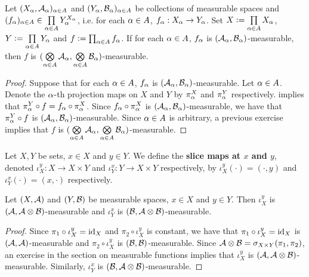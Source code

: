 \documentclass{book}
\begin{document}
	\begin{ex} 
		Let $(X_{\alpha}, \mathcal{A}_{\alpha})_{\alpha \in A}$ and $(Y_{\alpha}, \mathcal{B}_{\alpha})_{\alpha \in A}$ be collections of measurable spaces and $(f_{\alpha})_{\alpha \in A} \in \prod\limits_{\alpha \in A} Y_{\alpha}^{X_{\alpha}}$, i.e. for each $\alpha \in A$, $f_{\alpha}:X_{\alpha} \rightarrow Y_{\alpha}$. Set $X \vcentcolon= \prod\limits_{\alpha \in A} X_{\alpha}$, $Y \vcentcolon= \prod\limits_{\alpha \in A}Y_{\alpha}$ and $f \vcentcolon= \prod_{\alpha \in A} f_{\alpha}$. If for each $\alpha \in A$, $f_{\alpha}$ is $(\mathcal{A}_{\alpha}, \mathcal{B}_{\alpha})$-measurable, then $f$ is $(\bigotimes\limits_{\alpha \in A} \mathcal{A}_{\alpha}, \bigotimes\limits_{\alpha \in A} \mathcal{B}_{\alpha})$-measurable.
	\end{ex}
	
	\begin{proof} 
		Suppose that for each $\alpha \in A$, $f_{\alpha}$ is $(\mathcal{A}_{\alpha}, \mathcal{B}_{\alpha})$-measurable. Let $\alpha \in A$. Denote the $\alpha$-th projection maps on $X$ and $Y$ by $\pi^X_{\alpha}$ and $\pi^Y_{\alpha}$ respectively.   implies that $\pi^Y_{\alpha} \circ f = f_{\alpha} \circ \pi^X_{\alpha}$. Since $f_{\alpha} \circ \pi^X_{\alpha}$ is $(\mathcal{A}_{\alpha}, \mathcal{B}_{\alpha})$-measurable, we have that $\pi^Y_{\alpha} \circ f$ is $(\mathcal{A}_{\alpha}, \mathcal{B}_{\alpha})$-measurable. Since $\alpha \in A$ is arbitrary, a previous exercise implies that $f$ is $(\bigotimes\limits_{\alpha \in A} \mathcal{A}_{\alpha}, \bigotimes\limits_{\alpha \in A} \mathcal{B}_{\alpha})$-measurable.
	\end{proof}

	\begin{defn} 
		Let $X, Y$ be sets, $x \in X$ and $y \in Y$. We define the \textbf{slice maps at $x$ and $y$}, denoted $\iota^y_X: X \rightarrow X \times Y$ and $\iota^x_Y: Y \rightarrow X \times Y$ respectively, by $\iota^y_X(\cdot) = (\cdot, y)$ and $\iota^x_Y(\cdot) = (x, \cdot)$ respectively. 
	\end{defn}
	
	\begin{ex} 
		Let $(X, \mathcal{A} )$ and $(Y, \mathcal{B})$ be measurable spaces, $x \in X$ and $y \in Y$. Then $\iota^y_X$ is $(\mathcal{A}, \mathcal{A} \otimes \mathcal{B})$-measurable and $\iota^x_Y$  is $(\mathcal{B}, \mathcal{A} \otimes \mathcal{B})$-measurable.
	\end{ex}
	
	\begin{proof}
		Since $\pi_1 \circ \iota^y_X = \operatorname{id}_{X}$ and $\pi_2 \circ \iota^y_X$ is constant, we have that $\pi_1 \circ \iota^y_X = \operatorname{id}_{X}$ is $(\mathcal{A}, \mathcal{A})$-measurable and $\pi_2 \circ \iota^y_X$ is $(\mathcal{B}, \mathcal{B})$-measurable. Since $\mathcal{A} \otimes \mathcal{B} = \sigma_{X \times Y}(\pi_1, \pi_2)$, an exercise in the section on measurable functions implies that $\iota^y_X$ is $(\mathcal{A}, \mathcal{A} \otimes \mathcal{B})$-measurable. Similarly, $\iota^x_Y$ is $(\mathcal{B}, \mathcal{A} \otimes \mathcal{B})$-measurable.
	\end{proof}
	
\end{document}

